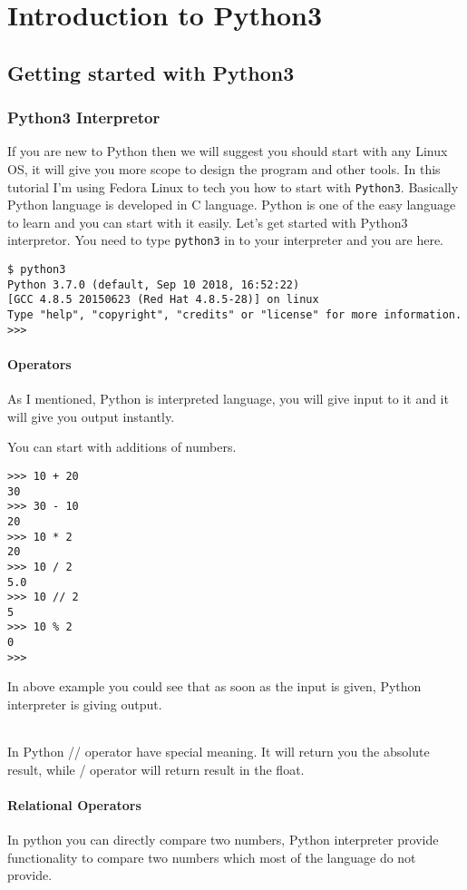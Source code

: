 \documentclass[letterpaper,12pt]{book}
\begin{document}
\tableofcontents
\part{Introduction to Python3}

\chapter{Getting started with Python3}

\section{Python3 Interpretor}
If you are new to Python then we will suggest you should start with any Linux OS, it will give you more scope to design the program and other tools. In this tutorial I'm using Fedora Linux to tech you how to start with \texttt{Python3}. Basically Python language is developed in C language. Python is one of the easy language to learn and you can start with it easily.
Let's get started with Python3 interpretor. You need to type \texttt{python3} in to your interpreter and you are here.

\begin{verbatim}
$ python3
Python 3.7.0 (default, Sep 10 2018, 16:52:22) 
[GCC 4.8.5 20150623 (Red Hat 4.8.5-28)] on linux
Type "help", "copyright", "credits" or "license" for more information.
>>>
\end{verbatim}
\subsection{Operators}
As I mentioned, Python is interpreted language, you will give input to it and it will give you output instantly.

You can start with additions of numbers.
\begin{verbatim}
>>> 10 + 20
30
>>> 30 - 10
20
>>> 10 * 2
20
>>> 10 / 2
5.0
>>> 10 // 2
5
>>> 10 % 2
0
>>> 
\end{verbatim}
In above example you could see that as soon as the input is given, Python interpreter is giving output.

\paragraph{}
In Python // operator have special meaning. It will return you the absolute result, while / operator will return result in the float.

\subsection{Relational Operators}
In python you can directly compare two numbers, Python interpreter provide functionality to compare two numbers which most of the language do not provide.
\end{document}
